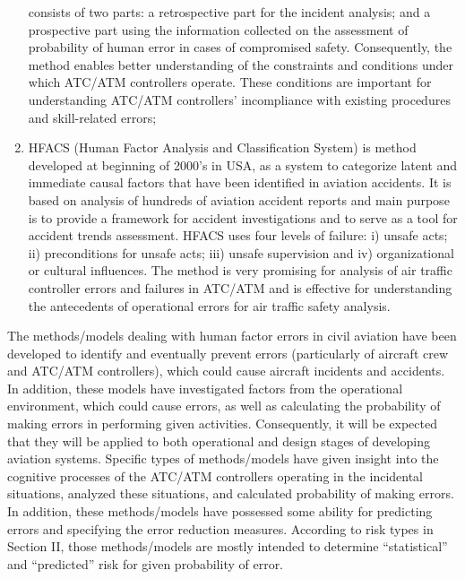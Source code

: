 \documentclass[a4paper, 10pt]{article}
\begin{document}
\begin{enumerate}
				consists of two parts: a retrospective part for the incident
				analysis; and a prospective part using the information collected
				on the assessment of probability of human error in cases of
				compromised safety. Consequently, the method enables better
				understanding of the constraints and conditions under which
				ATC/ATM controllers operate. These conditions are important
				for understanding ATC/ATM controllers’ incompliance with
				existing procedures and skill-related errors;
		\item HFACS (Human Factor Analysis and Classification
				System) is method developed at beginning of 2000’s in USA,
				as a system to categorize latent and immediate causal factors
				that have been identified in aviation accidents. It is based on
				analysis of hundreds of aviation accident reports and main purpose is to provide a framework for accident investigations
				and to serve as a tool for accident trends assessment. HFACS
				uses four levels of failure: i) unsafe acts; ii) preconditions for
				unsafe acts; iii) unsafe supervision and iv) organizational or
				cultural influences. The method is very promising for analysis
				of air traffic controller errors and failures in ATC/ATM and is
				effective for understanding the antecedents of operational
				errors for air traffic safety analysis.
\end{enumerate}\par

The methods/models dealing with human factor errors in
civil aviation have been developed to identify and eventually
prevent errors (particularly of aircraft crew and ATC/ATM
controllers), which could cause aircraft incidents and accidents.
In addition, these models have investigated factors from the
operational environment, which could cause errors, as well as
calculating the probability of making errors in performing
given activities. Consequently, it will be expected that they will
be applied to both operational and design stages of developing
aviation systems. Specific types of methods/models have given
insight into the cognitive processes of the ATC/ATM
controllers operating in the incidental situations, analyzed these
situations, and calculated probability of making errors. In
addition, these methods/models have possessed some ability
for predicting errors and specifying the error reduction
measures. According to risk types in Section II, those
methods/models are mostly intended to determine “statistical”
and “predicted” risk for given probability of error.\par
\end{document}
